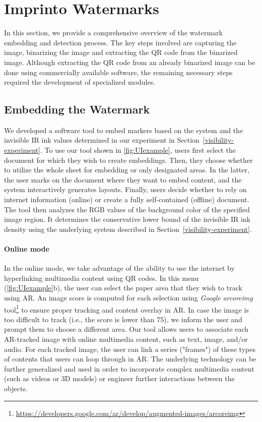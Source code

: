 \section{Imprinto Watermarks}
In this section, we provide a comprehensive overview of the watermark embedding and detection process. The key steps involved are capturing the image, binarizing the image and extracting the QR code from the binarized image. Although extracting the QR code from an already binarized image can be done using commercially available software, the remaining necessary steps required the development of specialized modules. 




\subsection{Embedding the Watermark}
We developed a software tool to embed markers based on the system and the invisible IR ink values determined in our experiment in Section~\ref{visibility-experiment}. To use our tool shown in \autoref{fig:UIexample}, users first select the document for which they wish to create embeddings. Then, they choose whether to utilize the whole sheet for embedding or only designated areas. In the latter, the user marks on the document where they want to embed content, and the system interactively generates layouts. Finally, users decide whether to rely on internet information (online) or create a fully self-contained (offline) document.
The tool then analyzes the RGB values of the background color of the specified image region. It determines the conservative lower bound of the invisible IR ink density using the underlying system described in Section~\ref{visibility-experiment}.



\paragraph{Online mode}
In the online mode, we take advantage of the ability to use the internet by hyperlinking multimedia content using QR codes.
In this menu (\autoref{fig:UIexample}b), the user can select the paper area that they wish to track using AR. An image score is computed for each selection using \textit{Google arcoreimg} tool\footnote{\url{https://developers.google.com/ar/develop/augmented-images/arcoreimg}} to ensure proper tracking and content overlay in AR.
In case the image is too difficult to track (i.e., the score is lower than 75), we inform the user and prompt them to choose a different area. Our tool allows users to associate each AR-tracked image with online multimedia content, such as text, image, and/or audio.
For each tracked image, the user can link a series ("frames") of these types of contents that users can loop through in AR. The underlying technology can be further generalized and used in order to incorporate complex multimedia content (such as videos or 3D models) or engineer further interactions between the objects. 

